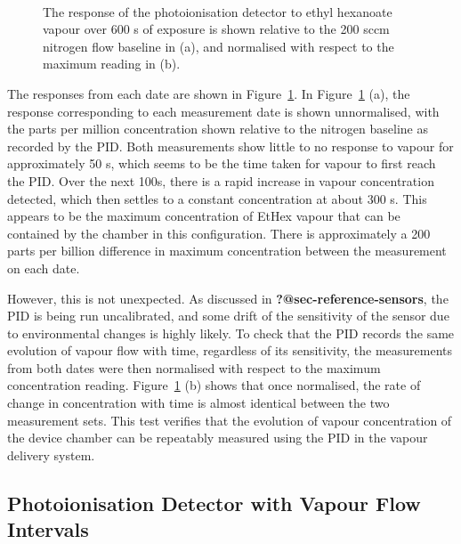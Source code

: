 \documentclass[
  a4paper,
]{scrbook}
\begin{document}
\begin{figure}
\begin{minipage}[t]{0.70\linewidth}
{{}

}

\end{minipage}%
%
\begin{minipage}[t]{0.15\linewidth}

{\centering 

~

}

\end{minipage}%

\caption{\label{fig-PID-EtHex-response}The response of the
photoionisation detector to ethyl hexanoate vapour over 600 s of
exposure is shown relative to the 200 sccm nitrogen flow baseline in
(a), and normalised with respect to the maximum reading in (b).}

\end{figure}

The responses from each date are shown in
Figure~\ref{fig-PID-EtHex-response}. In
Figure~\ref{fig-PID-EtHex-response} (a), the response corresponding to
each measurement date is shown unnormalised, with the parts per million
concentration shown relative to the nitrogen baseline as recorded by the
PID. Both measurements show little to no response to vapour for
approximately 50 s, which seems to be the time taken for vapour to first
reach the PID. Over the next 100s, there is a rapid increase in vapour
concentration detected, which then settles to a constant concentration
at about 300 s. This appears to be the maximum concentration of EtHex
vapour that can be contained by the chamber in this configuration. There
is approximately a 200 parts per billion difference in maximum
concentration between the measurement on each date.

However, this is not unexpected. As discussed in
\textbf{?@sec-reference-sensors}, the PID is being run uncalibrated, and
some drift of the sensitivity of the sensor due to environmental changes
is highly likely. To check that the PID records the same evolution of
vapour flow with time, regardless of its sensitivity, the measurements
from both dates were then normalised with respect to the maximum
concentration reading. Figure~\ref{fig-PID-EtHex-response} (b) shows
that once normalised, the rate of change in concentration with time is
almost identical between the two measurement sets. This test verifies
that the evolution of vapour concentration of the device chamber can be
repeatably measured using the PID in the vapour delivery system.

\hypertarget{photoionisation-detector-with-vapour-flow-intervals}{%
\subsection{Photoionisation Detector with Vapour Flow
Intervals}\label{photoionisation-detector-with-vapour-flow-intervals}}
\end{document}
